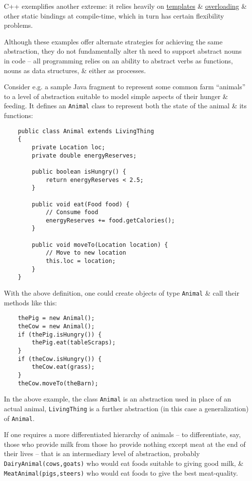 \documentclass{article}
\begin{document}
C++ exemplifies another extreme: it relies heavily on \href{https://en.wikipedia.org/wiki/Generic_programming}{templates} \& \href{https://en.wikipedia.org/wiki/Method_overloading}{overloading} \& other static bindings at compile-time, which in turn has certain flexibility problems.

Although these examples offer alternate strategies for achieving the same abstraction, they do not fundamentally alter th need to support abstract nouns in code -- all programming relies on an ability to abstract verbs as functions, nouns as data structures, \& either as processes.

Consider e.g. a sample Java fragment to represent some common farm ``animals'' to a level of abstraction suitable to model simple aspects of their hunger \& feeding. It defines an {\tt Animal} class to represent both the state of the animal \& its functions:
\begin{verbatim}
	public class Animal extends LivingThing
	{
		private Location loc;
		private double energyReserves;
		
		public boolean isHungry() {
			return energyReserves < 2.5;
		}
		
		public void eat(Food food) {
			// Consume food
			energyReserves += food.getCalories();
		}
		
		public void moveTo(Location location) {
			// Move to new location
			this.loc = location;
		}
	}
\end{verbatim}
With the above definition, one could create objects of type {\tt Animal} \& call their methods like this:
\begin{verbatim}
	thePig = new Animal();
	theCow = new Animal();
	if (thePig.isHungry()) {
		thePig.eat(tableScraps);
	}
	if (theCow.isHungry()) {
		theCow.eat(grass);
	}
	theCow.moveTo(theBarn);
\end{verbatim}
In the above example, the class {\tt Animal} is an abstraction used in place of an actual animal, {\tt LivingThing} is a further abstraction (in this case a generalization) of {\tt Animal}.

If one requires a more differentiated hierarchy of animals -- to differentiate, say, those who provide milk from those ho provide nothing except meat at the end of their lives -- that is an intermediary level of abstraction, probably {\tt DairyAnimal(cows,goats)} who would eat foods suitable to giving good milk, \& {\tt MeatAnimal(pigs,steers)} who would eat foods to give the best meat-quality.
\end{document}
